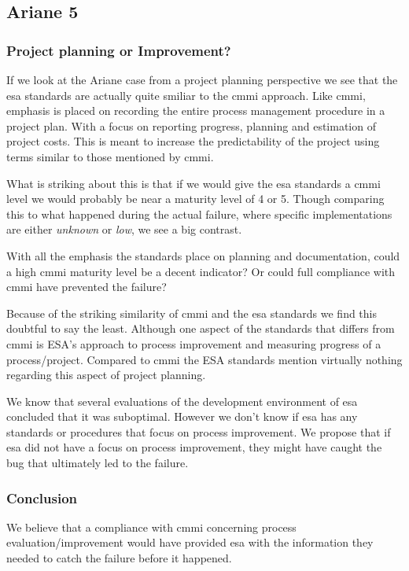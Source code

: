 \subsection{Ariane 5}
\subsubsection{Project planning or Improvement?}
If we look at the Ariane case from a project planning perspective we see that the \ac{esa} standards are actually quite smiliar to the \ac{cmmi} approach.
Like \ac{cmmi}, emphasis is placed on recording the entire process management procedure in a project plan. With a focus on reporting progress, planning and estimation of project costs. This is meant to increase the predictability of the project using terms similar to those mentioned by \ac{cmmi}.

What is striking about this is that if we would give the \ac{esa} standards a \ac{cmmi} level we would probably be near a maturity level of 4 or 5. Though comparing this to what happened during the actual failure, where specific implementations are either \textit{unknown} or \textit{low}, we see a big contrast.

With all the emphasis the standards place on planning and documentation, could a high \ac{cmmi} maturity level be a decent indicator? Or could full compliance with \ac{cmmi} have prevented the failure? 

Because of the striking similarity of \ac{cmmi} and the \ac{esa} standards we find this doubtful to say the least. Although one aspect of the standards that differs from \ac{cmmi} is ESA's approach to process improvement and measuring progress of a process/project. Compared to \ac{cmmi} the ESA standards mention virtually nothing regarding this aspect of project planning. 

We know that several evaluations of the development environment of \ac{esa} concluded that it was suboptimal. However we don't know if \ac{esa} has any standards or procedures that focus on process improvement. We propose that if \ac{esa} did not have a focus on process improvement, they might have caught the bug that ultimately led to the failure.

\subsubsection{Conclusion}
We believe that a compliance with \ac{cmmi} concerning process evaluation/improvement would have provided \ac{esa} with the information they needed to catch the failure before it happened. 

